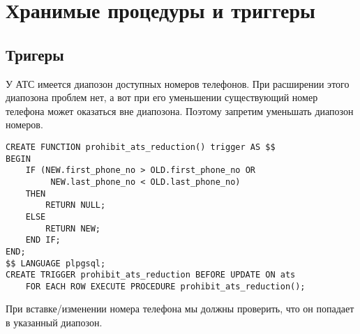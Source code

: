 \documentclass{report}
\begin{document}
\chapter{Хранимые процедуры и триггеры}

\section{Тригеры}

У АТС имеется диапозон доступных номеров телефонов. При расширении этого 
диапозона проблем нет, а вот при его уменьшении существующий номер 
телефона может оказаться вне диапозона. Поэтому запретим уменьшать 
диапозон номеров.

\begin{lstlisting}
CREATE FUNCTION prohibit_ats_reduction() trigger AS $$
BEGIN
    IF (NEW.first_phone_no > OLD.first_phone_no OR
         NEW.last_phone_no < OLD.last_phone_no)
    THEN
        RETURN NULL;
    ELSE
        RETURN NEW;
    END IF;
END;
$$ LANGUAGE plpgsql;
CREATE TRIGGER prohibit_ats_reduction BEFORE UPDATE ON ats
    FOR EACH ROW EXECUTE PROCEDURE prohibit_ats_reduction();
\end{lstlisting}

При вставке/изменении
номера телефона мы должны проверить, что он попадает в указанный диапозон.
\end{document}
